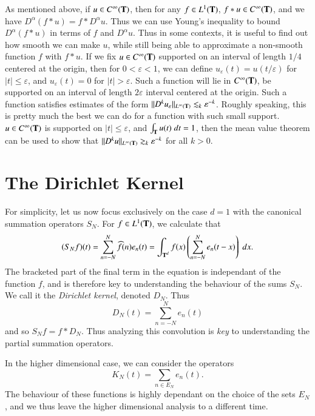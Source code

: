 As mentioned above, if $u \in C^\infty(\operatorname{\mathbf{T}})$, then for any $f \in L^1(\operatorname{\mathbf{T}})$, $f * u \in C^\infty(\operatorname{\mathbf{T}})$, and we have $D^\alpha(f * u) = f * D^\alpha u$. Thus we can use Young's inequality to bound $D^\alpha(f * u)$ in terms of $f$ and $D^\alpha u$. Thus in some contexts, it is useful to find out how smooth we can make $u$, while still being able to approximate a non-smooth function $f$ with $f * u$. If we fix $u \in C^\infty(\operatorname{\mathbf{T}})$ supported on an interval of length $1/4$ centered at the origin, then for $0 < \varepsilon < 1$, we can define $u_\varepsilon(t) = u(t/\varepsilon)$ for $|t| \leq \varepsilon$, and $u_\varepsilon(t) = 0$ for $|t| > \varepsilon$. Such a function will lie in $C^\infty(\operatorname{\mathbf{T}})$, be supported on an interval of length $2\varepsilon$ interval centered at the origin. Such a function satisfies estimates of the form $\| D^k u_\varepsilon \|_{L^\infty(\operatorname{\mathbf{T}})} \lesssim_k \varepsilon^{-k}$. Roughly speaking, this is pretty much the best we can do for a function with such small support. $u \in C^\infty(\operatorname{\mathbf{T}})$ is supported on $|t| \leq \varepsilon$, and $\int_{\operatorname{\mathbf{T}}} u(t)\; dt = 1$, then the mean value theorem can be used to show that $\| D^k u \|_{L^\infty(\operatorname{\mathbf{T}})} \gtrsim_k \varepsilon^{-k}$ for all $k > 0$.

\section{The Dirichlet Kernel}

For simplicity, let us now focus exclusively on the case $d = 1$ with the canonical summation operators $S_N$. For $f \in L^1(\operatorname{\mathbf{T}})$, we calculate that
%
\[ (S_Nf)(t) = \sum_{n = -N}^N \widehat{f}(n) e_n(t) = \int_{\operatorname{\mathbf{T}}^d} f(x) \left( \sum_{n = -N}^N e_n(t - x) \right)\; dx.  \]
%
The bracketed part of the final term in the equation is independant of the function $f$, and is therefore key to understanding the behaviour of the sums $S_N$. We call it the \emph{Dirichlet kernel}, denoted $D_N$. Thus
%
\[ D_N(t) = \sum_{n = -N}^N e_n(t) \]
%
and so $S_N f = f * D_N$. Thus analyzing this convolution is \emph{key} to understanding the partial summation operators.

\begin{remark}
    In the higher dimensional case, we can consider the operators
    \[ K_N(t) = \sum_{n \in E_N} e_n(t). \]
    The behaviour of these functions is highly dependant on the choice of the sets $E_N$, and we thus leave the higher dimensional analysis to a different time.
\end{remark}

